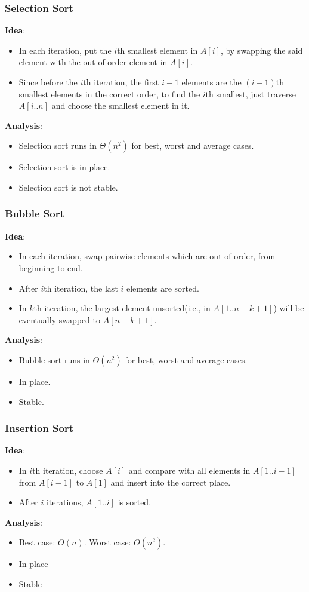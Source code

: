 \documentclass[12pt]{article}
\theoremstyle{definition}
\newcommand{\T}{\Theta}
\begin{document}
\subsubsection{Selection Sort}
\textbf{Idea}:
\begin{itemize}
\item In each iteration, put the $i$th smallest element in $A[i]$, by swapping the said element with the out-of-order element in $A[i]$.
\item Since before the $i$th iteration,  the first $i-1$ elements are the $(i-1)$th smallest elements in the correct order, to find the $i$th smallest, just traverse $A[i..n]$ and choose the smallest element in it.
\end{itemize}
\textbf{Analysis}:
\begin{itemize}
\item Selection sort runs in $\T(n^2)$ for best, worst and average cases.
\item Selection sort is in place.
\item Selection sort is not stable.
\end{itemize}
\subsubsection{Bubble Sort}
\textbf{Idea}:
\begin{itemize}
\item In each iteration, swap pairwise elements which are out of order, from beginning to end.
\item After $i$th iteration, the last $i$ elements are sorted.
\item In $k$th iteration, the largest element unsorted(i.e., in $A[1..n-k+1]$) will be eventually swapped to $A[n-k+1]$.
\end{itemize}
\textbf{Analysis}:
\begin{itemize}
  \item Bubble sort runs in $\T(n^2)$ for best, worst and average cases.
  \item In place.
  \item Stable.
\end{itemize}
\subsubsection{Insertion Sort}
\textbf{Idea}:
\begin{itemize}
  \item In $i$th iteration, choose $A[i]$ and compare with all elements in $A[1..i-1]$ from $A[i-1]$ to $A[1]$ and insert into the correct place.
  \item After $i$ iterations, $A[1..i]$ is sorted.
\end{itemize} 
\textbf{Analysis}:
\begin{itemize}
  \item Best case: $O(n)$. Worst case: $O(n^2)$.
  \item In place
  \item Stable
\end{itemize}
\end{document}
